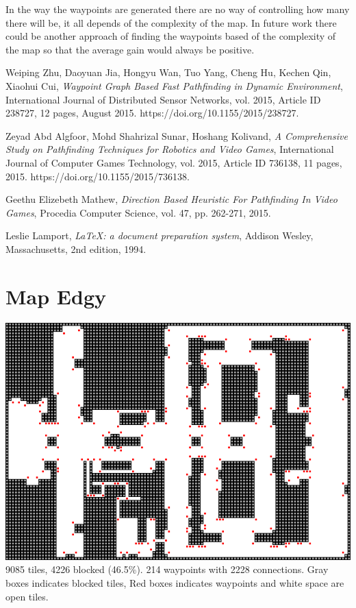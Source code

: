 \documentclass[a4paper]{article}
\begin{document}
In the way the waypoints are generated there are no way of controlling how many there will be, it all depends of the complexity of the map. In future work there could be another approach of finding the waypoints based of the complexity of the map so that the average gain would always be positive.

\newpage
\begin{thebibliography}{9}

  Weiping Zhu, Daoyuan Jia, Hongyu Wan, Tuo Yang, Cheng Hu, Kechen Qin, Xiaohui Cui,
  \textit{Waypoint Graph Based Fast Pathfinding in Dynamic Environment},
  International Journal of Distributed Sensor Networks, vol. 2015, Article ID 238727, 12 pages,
  August 2015. https://doi.org/10.1155/2015/238727.

  Zeyad Abd Algfoor, Mohd Shahrizal Sunar, Hoshang Kolivand,
  \textit{A Comprehensive Study on Pathfinding Techniques for Robotics and Video Games},
  International Journal of Computer Games Technology, vol. 2015, Article ID 736138, 11 pages,
  2015. https://doi.org/10.1155/2015/736138.

  Geethu Elizebeth Mathew,
  \textit{Direction Based Heuristic For Pathfinding In Video Games},
  Procedia Computer Science, vol. 47, pp. 262-271,
  2015.

  Leslie Lamport,
  \textit{\LaTeX: a document preparation system},
  Addison Wesley, Massachusetts,
  2nd edition,
  1994.

\end{thebibliography}


\clearpage
\onecolumn
\appendix
\appendixpage
\addappheadtotoc

\section{Map Edgy}\label{ap.edgy}
\centering
\includegraphics[width=\textwidth,height=\textheight,keepaspectratio]{ChartsAndFigures/Edgy.png}
9085 tiles, 4226 blocked (46.5\%). 214 waypoints with 2228 connections. Gray boxes indicates blocked tiles, Red boxes indicates waypoints and white space are open tiles.
\end{document}
